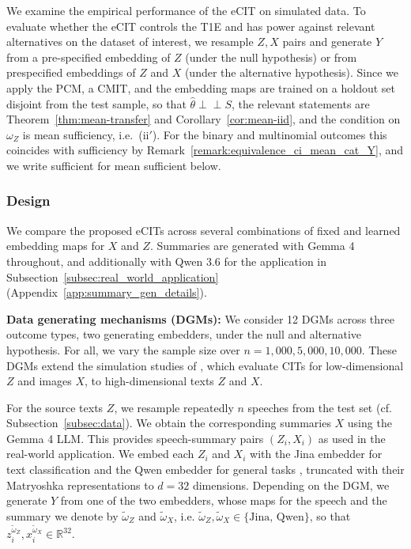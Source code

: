 \documentclass[twoside,11pt]{article}
\newcommand{\indep}{\perp \!\!\! \perp}
\begin{document}
We examine the empirical performance of the eCIT on simulated data. To evaluate whether the eCIT controls the T1E and has power against relevant alternatives on the dataset of interest, we resample $Z,X$ pairs and generate $Y$ from a pre-specified embedding of $Z$ (under the null hypothesis) or from prespecified embeddings of $Z$ and $X$ (under the alternative hypothesis).
Since we apply the PCM, a CMIT, and the embedding maps are trained on a holdout set disjoint from the test sample, so that $\hat\theta\indep S$, the relevant statements are Theorem~\ref{thm:mean-transfer} and Corollary~\ref{cor:mean-iid}, and the condition on $\omega_Z$ is mean sufficiency, i.e.\ (ii$'$). For the binary and multinomial outcomes this coincides with sufficiency by Remark~\ref{remark:equivalence_ci_mean_cat_Y}, and we write sufficient for mean sufficient below.

\subsubsection{Design}

We compare the proposed eCITs across several combinations of fixed and learned embedding maps for $X$ and $Z$. 
Summaries are generated with Gemma 4 \citep{gemmateam2026gemma4} throughout, and additionally with Qwen 3.6 \citep{qwen3.6-27b} for the application in Subsection~\ref{subsec:real_world_application} (Appendix~\ref{app:summary_gen_details}).

\textbf{Data generating mechanisms (DGMs):} We consider 12 DGMs across three outcome types, two generating embedders, under the null and alternative hypothesis. For all, we vary the sample size over $n=1{,}000, 5{,}000, 10{,}000$. 
These DGMs extend the simulation studies of \citet{simnacher2026deep}, which evaluate CITs for low-dimensional $Z$ and images $X$, to high-dimensional texts $Z$ and $X$.

For the source texts $Z$, we resample repeatedly $n$ speeches from the test set (cf. Subsection~\ref{subsec:data}). 
We obtain the corresponding summaries $X$ using the Gemma 4 LLM.
This provides speech-summary pairs $(Z_i,X_i)$ as used in the real-world application. 
We embed each $Z_i$ and $X_i$ with the Jina embedder for text classification \citep{akram2026jinaembeddingsv5texttasktargetedembeddingdistillation} and the Qwen embedder for general tasks \citep{qwen3embedding}, truncated with their Matryoshka representations \citep{kusupati2022matryoshka} to $d = 32$ dimensions. Depending on the DGM, we generate $Y$ from one of the two embedders, whose maps for the speech and the summary we denote by $\widetilde\omega_Z$ and $\widetilde\omega_X$, i.e. $\widetilde\omega_Z, \widetilde\omega_X\in \{\text{Jina, Qwen} \}$, so that $z_i^{\widetilde\omega_Z}, x_i^{\widetilde\omega_X} \in \mathbb{R}^{32}$.
\end{document}
